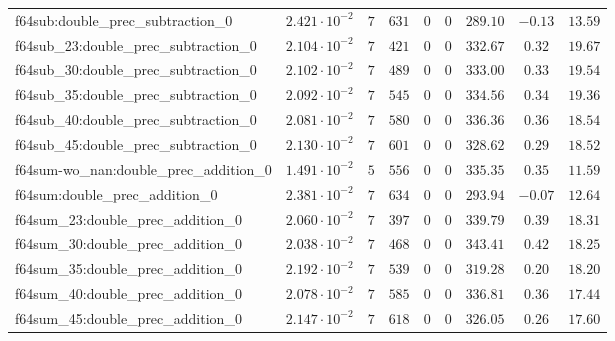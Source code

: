 \begin{tabular}{|l|c|c|c|c|c|c|c|c|}
f64sub:double\_prec\_subtraction\_0            & $ 2.421 \cdot 10^{-2} $ & $ 7      $ & $ 631    $ & $ 0   $ & $ 0   $ & $ 289.10      $ & $ -0.13   $ & $ 13.59   $ \\
f64sub\_23:double\_prec\_subtraction\_0        & $ 2.104 \cdot 10^{-2} $ & $ 7      $ & $ 421    $ & $ 0   $ & $ 0   $ & $ 332.67      $ & $ 0.32    $ & $ 19.67   $ \\
f64sub\_30:double\_prec\_subtraction\_0        & $ 2.102 \cdot 10^{-2} $ & $ 7      $ & $ 489    $ & $ 0   $ & $ 0   $ & $ 333.00      $ & $ 0.33    $ & $ 19.54   $ \\
f64sub\_35:double\_prec\_subtraction\_0        & $ 2.092 \cdot 10^{-2} $ & $ 7      $ & $ 545    $ & $ 0   $ & $ 0   $ & $ 334.56      $ & $ 0.34    $ & $ 19.36   $ \\
f64sub\_40:double\_prec\_subtraction\_0        & $ 2.081 \cdot 10^{-2} $ & $ 7      $ & $ 580    $ & $ 0   $ & $ 0   $ & $ 336.36      $ & $ 0.36    $ & $ 18.54   $ \\
f64sub\_45:double\_prec\_subtraction\_0        & $ 2.130 \cdot 10^{-2} $ & $ 7      $ & $ 601    $ & $ 0   $ & $ 0   $ & $ 328.62      $ & $ 0.29    $ & $ 18.52   $ \\
f64sum-wo\_nan:double\_prec\_addition\_0       & $ 1.491 \cdot 10^{-2} $ & $ 5      $ & $ 556    $ & $ 0   $ & $ 0   $ & $ 335.35      $ & $ 0.35    $ & $ 11.59   $ \\
f64sum:double\_prec\_addition\_0               & $ 2.381 \cdot 10^{-2} $ & $ 7      $ & $ 634    $ & $ 0   $ & $ 0   $ & $ 293.94      $ & $ -0.07   $ & $ 12.64   $ \\
f64sum\_23:double\_prec\_addition\_0           & $ 2.060 \cdot 10^{-2} $ & $ 7      $ & $ 397    $ & $ 0   $ & $ 0   $ & $ 339.79      $ & $ 0.39    $ & $ 18.31   $ \\
f64sum\_30:double\_prec\_addition\_0           & $ 2.038 \cdot 10^{-2} $ & $ 7      $ & $ 468    $ & $ 0   $ & $ 0   $ & $ 343.41      $ & $ 0.42    $ & $ 18.25   $ \\
f64sum\_35:double\_prec\_addition\_0           & $ 2.192 \cdot 10^{-2} $ & $ 7      $ & $ 539    $ & $ 0   $ & $ 0   $ & $ 319.28      $ & $ 0.20    $ & $ 18.20   $ \\
f64sum\_40:double\_prec\_addition\_0           & $ 2.078 \cdot 10^{-2} $ & $ 7      $ & $ 585    $ & $ 0   $ & $ 0   $ & $ 336.81      $ & $ 0.36    $ & $ 17.44   $ \\
f64sum\_45:double\_prec\_addition\_0           & $ 2.147 \cdot 10^{-2} $ & $ 7      $ & $ 618    $ & $ 0   $ & $ 0   $ & $ 326.05      $ & $ 0.26    $ & $ 17.60   $ \\

\end{tabular}
